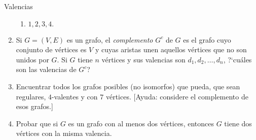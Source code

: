 \begin{section}{Valencias}
\begin{enumerate}
\begin{multicols}{2}
\begin{enumerate}
		\item $1,2,3,4.$
	\end{enumerate}
\end{multicols}
%
%
%
\item Si $G=(V,E)$ es un grafo, el {\em complemento} $G^c$ de $G$ es el grafo cuyo conjunto de
vértices es $V$ y cuyas aristas unen aquellos vértices que no son
unidos por $G$. Si $G$ tiene $n$ vértices y sus valencias son
$d_1,d_2,\ldots,d_n$, ?`cuáles son las valencias de $G^c$?
\item Encuentrar todos los grafos posibles (no isomorfos) que pueda, que sean regulares,
$4$-valentes y con $7$ vértices. [Ayuda: considere el complemento de esos grafos.]

\item Probar que si $G$ es un grafo con al menos dos vértices, entonces $G$ tiene dos
vértices con la misma valencia.
\end{enumerate}


\end{section}




